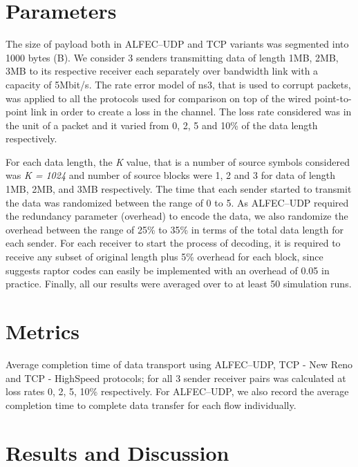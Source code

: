 \section{Parameters}
The size of payload both in ALFEC--UDP and TCP variants was segmented into 1000 bytes (B). We consider 3 senders transmitting data of length 1MB, 2MB, 3MB to its respective receiver each separately over bandwidth link with a capacity of 5Mbit/s. The rate error model of ns3, that is used to corrupt packets, was applied to all the protocols used for comparison on top of the wired point-to-point link in order to create a loss in the channel. The loss rate considered was in the unit of a packet and it varied from 0, 2, 5 and 10\% of the data length respectively.

For each data length, the \textit{K} value, that is a number of source symbols considered was \textit{K = 1024} and number of source blocks were 1, 2 and 3 for data of length 1MB, 2MB, and 3MB respectively. The time that each sender started to transmit the data was randomized between the range of 0 to 5. As ALFEC--UDP required the redundancy parameter (overhead) to encode the data, we also randomize the overhead between the range of 25\% to 35\% in terms of the total data length for each sender. For each receiver to start the process of decoding, it is required to receive any subset of original length plus 5\% overhead for each block, since \cite{mackay2005fountain} suggests raptor codes can easily be implemented with an overhead of 0.05 in practice. Finally, all our results were averaged over to at least 50 simulation runs. 

\section{Metrics}
Average completion time of data transport using ALFEC--UDP, TCP - New Reno and TCP - HighSpeed protocols; for all 3 sender receiver pairs was calculated at loss rates 0, 2, 5, 10\% respectively. For ALFEC--UDP, we also record the average completion time to complete data transfer for each flow individually.

\section{Results and Discussion}

